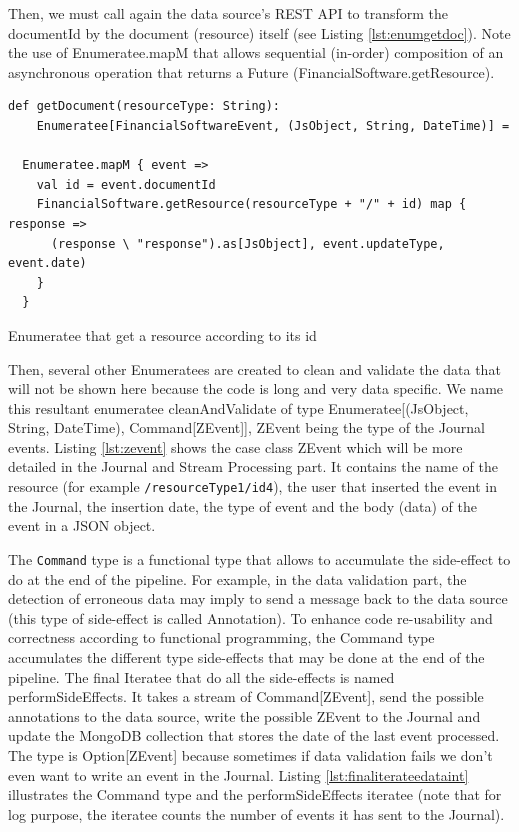 Then, we must call again the data source's REST API to transform the documentId by the document (resource) itself (see Listing \ref{lst:enumgetdoc}).
Note the use of Enumeratee.mapM that allows sequential (in-order) composition of an asynchronous operation that returns a Future (FinancialSoftware.getResource).

\begin{listing}[h]
\begin{verbatim}
def getDocument(resourceType: String): 
    Enumeratee[FinancialSoftwareEvent, (JsObject, String, DateTime)] =

  Enumeratee.mapM { event =>
    val id = event.documentId
    FinancialSoftware.getResource(resourceType + "/" + id) map { response =>
      (response \ "response").as[JsObject], event.updateType, event.date)
    }
  }
\end{verbatim}
\caption{Enumeratee that get a resource according to its id}
\label{lst:enumgetdoc}
\end{listing}

Then, several other Enumeratees are created to clean and validate the data that will not be shown here because the code is long and very data specific.
We name this resultant enumeratee cleanAndValidate of type Enumeratee[(JsObject, String, DateTime), Command[ZEvent]], ZEvent being the type of the Journal events. 
Listing \ref{lst:zevent} shows the case class ZEvent which will be more detailed in the Journal and Stream Processing part. It contains the name of the resource (for example
\verb|/resourceType1/id4|), the user that inserted the event in the Journal, the insertion date, the type of event and the body (data) of the event in a JSON object.

The \verb|Command| type is a functional type that allows to accumulate the side-effect to do at the end of the pipeline. For example, in the data validation part, the
detection of erroneous data may imply to send a message back to the data source (this type of side-effect is called Annotation). To enhance code re-usability and correctness according to functional programming, the Command type accumulates the different type side-effects that may be done at the end of the pipeline. The final Iteratee that do all the side-effects
is named performSideEffects. It takes a stream of Command[ZEvent], send the possible annotations to the data source, write the possible ZEvent to the Journal and update
the MongoDB collection that stores the date of the last event processed. The type is
Option[ZEvent] because sometimes if data validation fails we don't even want to write an event in the Journal. Listing \ref{lst:finaliterateedataint} illustrates the Command
type and the performSideEffects iteratee (note that for log purpose, the iteratee counts the number of events it has sent to the Journal).

